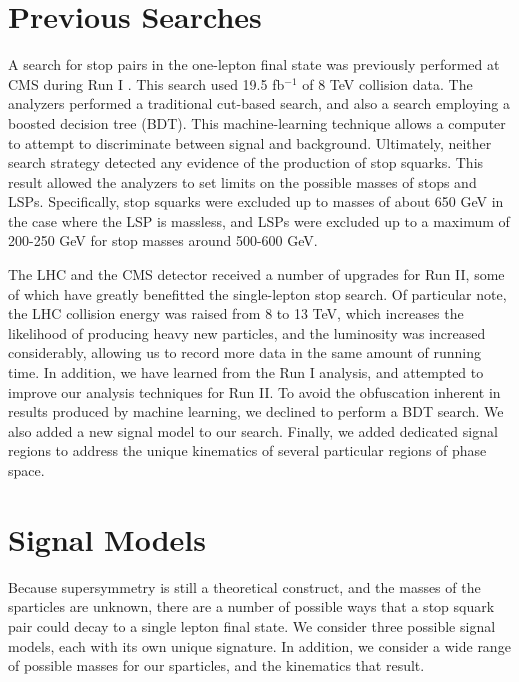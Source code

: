 \section{Previous Searches}
\label{sec:stop:run1}

A search for stop pairs in the one-lepton final state was previously
performed at CMS during Run I \cite{stop1l8tev}. This search used 19.5
fb$^{-1}$ of 8 TeV collision data. The analyzers performed a traditional
cut-based search, and also a search employing a boosted decision tree
(BDT). This machine-learning technique allows a computer to attempt to
discriminate between signal and background. Ultimately, neither search
strategy detected any evidence of the production of stop squarks. This
result allowed the analyzers to set limits on the possible masses of
stops and LSPs. Specifically, stop squarks were excluded up to masses
of about 650 GeV in the case where the LSP is massless, and LSPs were
excluded up to a maximum of 200-250 GeV for stop masses around 500-600
GeV.

The LHC and the CMS detector received a number of upgrades for Run II,
some of which have greatly benefitted the single-lepton stop
search. Of particular note, the LHC collision energy was raised from 8
to 13 TeV, which increases the likelihood of producing heavy new
particles, and the luminosity was increased considerably, allowing us %
to record more data in the same amount of running time. In addition,
we have learned from the Run I analysis, and attempted to improve our
analysis techniques for Run II. To avoid the obfuscation inherent in
results produced by machine learning, we declined to perform a BDT
search. We also added a new signal model to our search. Finally, we
added dedicated signal regions to address the unique kinematics of
several particular regions of phase space.



\section{Signal Models}
\label{sec:stop:sigmodels}

Because supersymmetry is still a theoretical construct, and the masses
of the sparticles are unknown, there are a number of possible
ways that a stop squark pair could decay to a single lepton final
state. We consider three possible signal models, each with its own
unique signature. In addition, we consider a wide range of possible
masses for our sparticles, and the kinematics that result.

